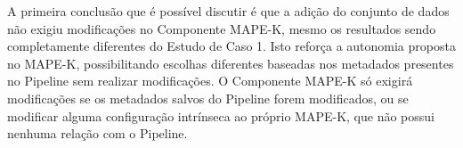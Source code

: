 \documentclass[portugues]{ic-tese}
\begin{document}
\begin{table}[H]
\begin{center}
  \caption{Quantidade de modificações realizadas ao adicionar um novo conjunto de dados ao \textit{Pipeline}}
\label{tbl:ManutencaoPipelineDataset}
\end{center}
\end{table}

A primeira conclusão que é possível discutir é que a adição do conjunto de dados não exigiu modificações no Componente MAPE-K, mesmo os resultados sendo completamente diferentes do Estudo de Caso 1. Isto reforça a autonomia proposta no MAPE-K, possibilitando escolhas diferentes baseadas nos metadados presentes no Pipeline sem realizar modificações. O Componente MAPE-K só exigirá modificações se os metadados salvos do Pipeline forem modificados, ou se modificar alguma configuração intrínseca ao próprio MAPE-K, que não possui nenhuma relação com o Pipeline. 
\end{document}
